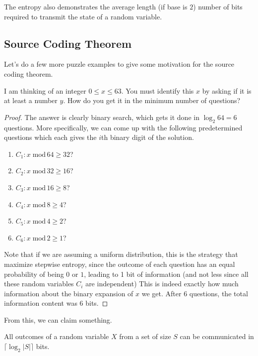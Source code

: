 \documentclass{article}
\begin{document}
    The entropy also demonstrates the average length (if base is $2$) number of bits required to transmit the state of a random variable. 

  \subsection{Source Coding Theorem}

    Let's do a few more puzzle examples to give some motivation for the source coding theorem. 

    \begin{exercise}[63 Puzzle]
      I am thinking of an integer $0 \leq x \leq 63$. You must identify this $x$ by asking if it is at least a number $y$. How do you get it in the minimum number of questions? 
    \end{exercise}

    \begin{proof}
      The answer is clearly binary search, which gets it done in $\log_2 64 = 6$ questions. More specifically, we can come up with the following predetermined questions which each gives the $i$th binary digit of the solution. 
      \begin{enumerate}
        \item $C_1: x \; \mathrm{mod} \, 64 \geq 32$? 
        \item $C_2: x \; \mathrm{mod} \, 32 \geq 16$? 
        \item $C_3: x \; \mathrm{mod} \, 16 \geq 8$? 
        \item $C_4: x \; \mathrm{mod} \, 8 \geq 4$? 
        \item $C_5: x \; \mathrm{mod} \, 4 \geq 2$? 
        \item $C_6: x \; \mathrm{mod} \, 2 \geq 1$? 
      \end{enumerate}
      Note that if we are assuming a uniform distribution, this is the strategy that maximize stepwise entropy, since the outcome of each question has an equal probability of being $0$ or $1$, leading to 1 bit of information (and not less since all these random variables $C_i$ are independent) This is indeed exactly how much information about the binary expansion of $x$ we get. After 6 questions, the total information content was 6 bits. 
    \end{proof}

    From this, we can claim something. 

    \begin{lemma}
      All outcomes of a random variable $X$ from a set of size $S$ can be communicated in $\lceil \log_2 |S| \rceil$ bits. 
    \end{lemma}
\end{document}
